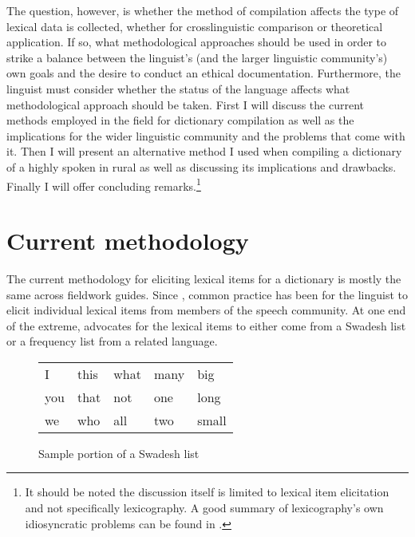 \documentclass[output=paper,
modfonts
]{langscibook}
\begin{document}
The question, however, is whether the method of compilation affects the type of lexical data is collected, whether for crosslinguistic comparison or theoretical application. If so, what methodological approaches should be used in order to strike a balance between the linguist’s (and the larger linguistic community’s) own goals and the desire to conduct an ethical documentation. Furthermore, the linguist must consider whether the status of the language affects what methodological approach should be taken. First I will discuss the current methods employed in the field for dictionary compilation as well as the implications for the wider linguistic community and the problems that come with it. Then I will present an alternative method I used when compiling a dictionary of a highly  spoken in rural  as well as discussing its implications and drawbacks. Finally I will offer concluding remarks.\footnote{ It should be noted the discussion itself is limited to lexical item elicitation and not specifically lexicography. A good summary of lexicography’s own idiosyncratic problems can be found in \citet{Haviland2006}.}

\section{Current methodology}

The current methodology for eliciting lexical items for a dictionary is mostly the same across fieldwork guides. Since \citet{Swadesh1955}, common practice has been for the linguist to elicit individual lexical items from members of the speech community. At one end of the extreme,  \citet{VauxCooper2007} advocates for the lexical items to either come from a Swadesh list or a frequency list from a related language. 
 

\begin{figure} 
 \begin{tabular}{lllll}
I   &  this &   what &  many &   big   \\
you &  that &   not  &  one  &   long  \\
we  &  who  &   all  &  two  &   small \\
\end{tabular}
\caption{Sample portion of a Swadesh list}
\label{fig:gelles:1}
\end{figure}
\end{document}
